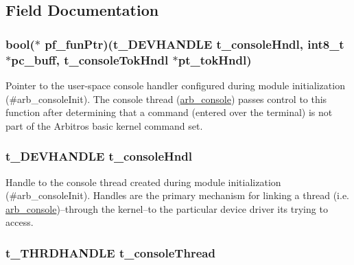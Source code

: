 \subsection{Field Documentation}
\hypertarget{structt__console_object_a43c5369489e99b24653bd0b0ff0e77e0}{
\subsubsection[{pf\-\_\-fun\-Ptr}]{\setlength{\rightskip}{0pt plus 5cm}bool($\ast$ pf\-\_\-fun\-Ptr)(t\-\_\-\-D\-E\-V\-H\-A\-N\-D\-L\-E {\bf t\-\_\-console\-Hndl}, int8\-\_\-t $\ast$pc\-\_\-buff, {\bf t\-\_\-console\-Tok\-Hndl} $\ast$pt\-\_\-tok\-Hndl)}}\label{structt__console_object_a43c5369489e99b24653bd0b0ff0e77e0}
Pointer to the user-\/space console handler configured during module initialization (\#arb\-\_\-console\-Init). The console thread (\hyperlink{arb__console_8c_a53daff761c655e05e651b375d95d6309}{arb\-\_\-console}) passes control to this function after determining that a command (entered over the terminal) is not part of the Arbitros basic kernel command set. \hypertarget{structt__console_object_a6f9d3d1fa28b532e16089830ab73c3b6}{
\subsubsection[{t\-\_\-console\-Hndl}]{\setlength{\rightskip}{0pt plus 5cm}t\-\_\-\-D\-E\-V\-H\-A\-N\-D\-L\-E t\-\_\-console\-Hndl}}\label{structt__console_object_a6f9d3d1fa28b532e16089830ab73c3b6}
Handle to the console thread created during module initialization (\#arb\-\_\-console\-Init). Handles are the primary mechanism for linking a thread (i.\-e. \hyperlink{arb__console_8c_a53daff761c655e05e651b375d95d6309}{arb\-\_\-console})--through the kernel--to the particular device driver its trying to access. \hypertarget{structt__console_object_ae0eceac7658ed204c517d618961e5cd9}{
\subsubsection[{t\-\_\-console\-Thread}]{\setlength{\rightskip}{0pt plus 5cm}t\-\_\-\-T\-H\-R\-D\-H\-A\-N\-D\-L\-E t\-\_\-console\-Thread}}\label{structt__console_object_ae0eceac7658ed204c517d618961e5cd9}

